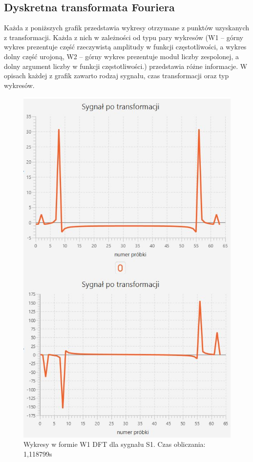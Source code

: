 \documentclass[12pt]{article}
\begin{document}
\subsection {Dyskretna transformata Fouriera}
Każda z poniższych grafik przedstawia wykresy otrzymane z punktów uzyskanych z transformacji. Każda z nich w zależności od typu pary wykresów (W1 – górny wykres prezentuje część rzeczywistą amplitudy w funkcji
częstotliwości, a wykres dolny część urojoną, W2 – górny wykres prezentuje moduł liczby zespolonej, a dolny argument liczby w funkcji częstotliwości.) przedstawia różne informacje. W opisach każdej z grafik zawarto rodzaj sygnału, czas transformacji oraz typ wykresów.

\begin{figure}[H]
	\centering
	\includegraphics[width=.8\linewidth]{DFT-S1-W1}
	\caption{Wykresy w formie W1 DFT dla sygnału S1. Czas obliczania: 1,118799s}
	\label{S1_sygnal}
\end{figure}
\end{document}
